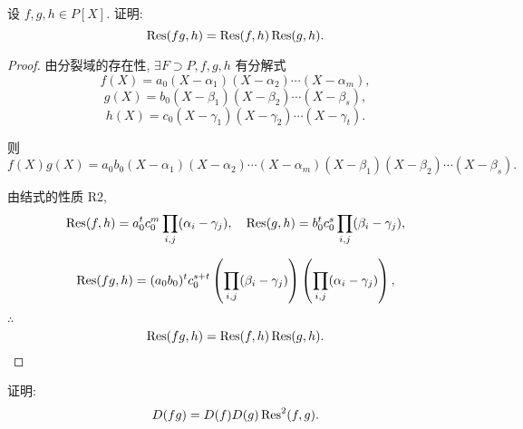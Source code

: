 \documentclass[UTF8]{ctexart}
\begin{document}
\begin{exercise}\label{ex2.5}
    设 $f,g,h\in P[X]$. 证明:
    \[\operatorname{Res} (fg,h)=\operatorname{Res} (f,h)\operatorname{Res} (g,h).\]
\end{exercise}
\begin{proof}
    由分裂域的存在性, $\exists F\supset P,f,g,h$ 有分解式
    \[f(X)=a_0(X-\alpha_1)(X-\alpha_2)\cdots(X-\alpha_m),\]
    \[g(X)=b_0(X-\beta_1)(X-\beta_2)\cdots(X-\beta_s),\]
    \[h(X)=c_0(X-\gamma_1)(X-\gamma_2)\cdots(X-\gamma_t).\]

    则
    \[f(X)g(X)=a_0b_0(X-\alpha_1)(X-\alpha_2)\cdots(X-\alpha_m)(X-\beta_1)(X-\beta_2)\cdots(X-\beta_s).\]

    由结式的性质 R2,
    \[\operatorname{Res} (f,h)=a_0^tc_0^m\prod\limits_{i,j}(\alpha_i-\gamma_j),\quad\operatorname{Res} (g,h)=b_0^tc_0^s\prod\limits_{i,j}(\beta_i-\gamma_j),\]
    
    \[\operatorname{Res} (fg,h)=(a_0b_0)^tc_0^{s+t}\left(\prod\limits_{i,j}(\beta_i-\gamma_j)\right)\left(\prod\limits_{i,j}(\alpha_i-\gamma_j)\right),\]

    $\therefore$
    \[\operatorname{Res} (fg,h)=\operatorname{Res} (f,h)\operatorname{Res} (g,h).\qedhere\]
\end{proof}
\begin{exercise}%
    证明:
    \[D(fg)=D(f)D(g)\operatorname{Res} ^2(f,g).\]
\end{exercise}
\end{document}
